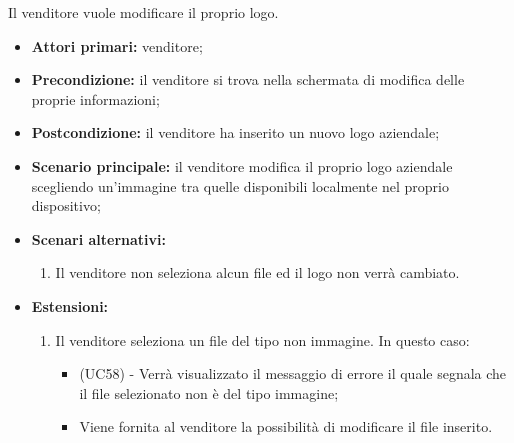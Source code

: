 Il venditore vuole modificare il proprio logo.
\begin{itemize}
    \item \textbf{Attori primari:} venditore;
    \item \textbf{Precondizione:} il venditore si trova nella schermata di modifica delle proprie informazioni;
    \item \textbf{Postcondizione:} il venditore ha inserito un nuovo logo aziendale;
    \item \textbf{Scenario principale:} il venditore modifica il proprio logo aziendale scegliendo un'immagine tra quelle disponibili localmente nel proprio dispositivo;
    \item \textbf{Scenari alternativi:}
    \begin{enumerate}[label=\lett]
    	\item Il venditore non seleziona alcun file ed il logo non verrà cambiato.
    \end{enumerate}
    \item \textbf{Estensioni:}
    \begin{enumerate}[label=\lett]
    	\item Il venditore seleziona un file del tipo non immagine. In questo caso:
    	\begin{itemize}
    		\item (UC58) - Verrà visualizzato il messaggio di errore il quale segnala che il file selezionato non è del tipo immagine;
    		\item Viene fornita al venditore la possibilità di modificare il file inserito.
    	\end{itemize}
    \end{enumerate}
\end{itemize}

